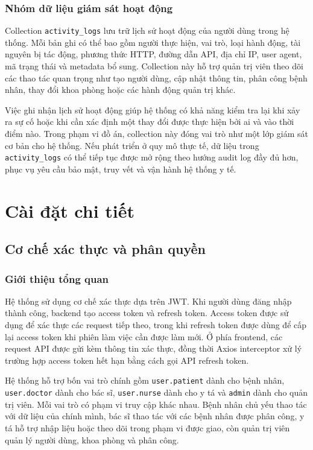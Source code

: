 \subsubsection{Nhóm dữ liệu giám sát hoạt động}

\par Collection \texttt{activity\_logs} lưu trữ lịch sử hoạt động của người dùng trong hệ thống. Mỗi bản ghi có thể bao gồm người thực hiện, vai trò, loại hành động, tài nguyên bị tác động, phương thức HTTP, đường dẫn API, địa chỉ IP, user agent, mã trạng thái và metadata bổ sung. Collection này hỗ trợ quản trị viên theo dõi các thao tác quan trọng như tạo người dùng, cập nhật thông tin, phân công bệnh nhân, thay đổi khoa phòng hoặc các hành động quản trị khác.

\par Việc ghi nhận lịch sử hoạt động giúp hệ thống có khả năng kiểm tra lại khi xảy ra sự cố hoặc khi cần xác định một thay đổi được thực hiện bởi ai và vào thời điểm nào. Trong phạm vi đồ án, collection này đóng vai trò như một lớp giám sát cơ bản cho hệ thống. Nếu phát triển ở quy mô thực tế, dữ liệu trong \texttt{activity\_logs} có thể tiếp tục được mở rộng theo hướng audit log đầy đủ hơn, phục vụ yêu cầu bảo mật, truy vết và vận hành hệ thống y tế.

\section{Cài đặt chi tiết}

\subsection{Cơ chế xác thực và phân quyền}

\subsubsection{Giới thiệu tổng quan}
\par Hệ thống sử dụng cơ chế xác thực dựa trên JWT. Khi người dùng đăng nhập thành công, backend tạo access token và refresh token. Access token được sử dụng để xác thực các request tiếp theo, trong khi refresh token được dùng để cấp lại access token khi phiên làm việc cần được làm mới. Ở phía frontend, các request API được gửi kèm thông tin xác thực, đồng thời Axios interceptor xử lý trường hợp access token hết hạn bằng cách gọi API refresh token.

\par Hệ thống hỗ trợ bốn vai trò chính gồm \texttt{user.patient} dành cho bệnh nhân, \texttt{user.doctor} dành cho bác sĩ, \texttt{user.nurse} dành cho y tá và \texttt{admin} dành cho quản trị viên. Mỗi vai trò có phạm vi truy cập khác nhau. Bệnh nhân chủ yếu thao tác với dữ liệu của chính mình, bác sĩ thao tác với các bệnh nhân được phân công, y tá hỗ trợ nhập liệu hoặc theo dõi trong phạm vi được giao, còn quản trị viên quản lý người dùng, khoa phòng và phân công.

